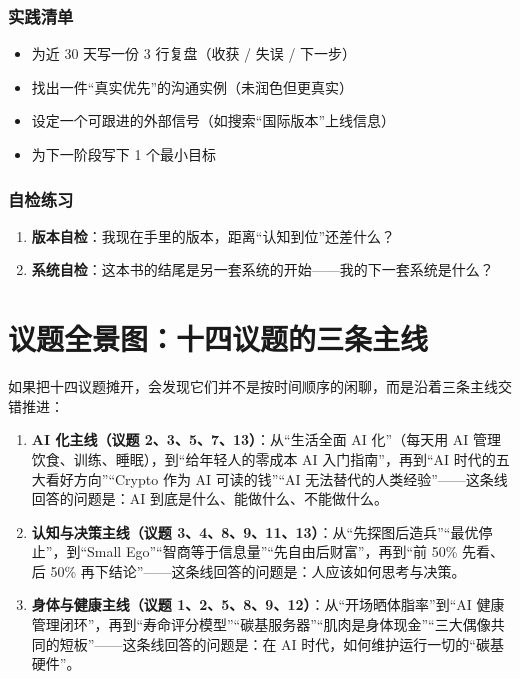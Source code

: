 \subsubsection{实践清单}

\begin{itemize}
\tightlist
\item[$\square$]
  为近 30 天写一份 3 行复盘（收获 / 失误 / 下一步）
\item[$\square$]
  找出一件``真实优先''的沟通实例（未润色但更真实）
\item[$\square$]
  设定一个可跟进的外部信号（如搜索``国际版本''上线信息）
\item[$\square$]
  为下一阶段写下 1 个最小目标
\end{itemize}

\subsubsection{自检练习}

\begin{enumerate}
\def\labelenumi{\arabic{enumi}.}
\tightlist
\item
  \textbf{版本自检}：我现在手里的版本，距离``认知到位''还差什么？
\item
  \textbf{系统自检}：这本书的结尾是另一套系统的开始------我的下一套系统是什么？
\end{enumerate}

\section{议题全景图：十四议题的三条主线}

如果把十四议题摊开，会发现它们并不是按时间顺序的闲聊，而是沿着三条主线交错推进：

\begin{enumerate}
\def\labelenumi{\arabic{enumi}.}
\tightlist
\item
  \textbf{AI 化主线（议题 2、3、5、7、13）}：从``生活全面 AI
  化''（每天用 AI 管理饮食、训练、睡眠），到``给年轻人的零成本 AI
  入门指南''，再到``AI 时代的五大看好方向''``Crypto 作为 AI
  可读的钱''``AI 无法替代的人类经验''------这条线回答的问题是：AI
  到底是什么、能做什么、不能做什么。
\item
  \textbf{认知与决策主线（议题
  3、4、8、9、11、13）}：从``先探图后造兵''``最优停止''，到``Small
  Ego''``智商等于信息量''``先自由后财富''，再到``前 50\% 先看、后 50\%
  再下结论''------这条线回答的问题是：人应该如何思考与决策。
\item
  \textbf{身体与健康主线（议题
  1、2、5、8、9、12）}：从``开场晒体脂率''到``AI
  健康管理闭环''，再到``寿命评分模型''``碳基服务器''``肌肉是身体现金''``三大偶像共同的短板''------这条线回答的问题是：在
  AI 时代，如何维护运行一切的``碳基硬件''。
\end{enumerate}

